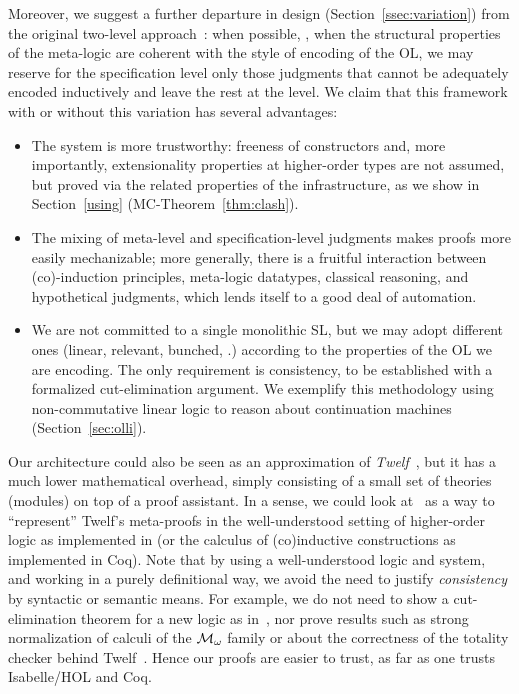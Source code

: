 \documentclass[final]{svjour3}
\begin{document}
Moreover, we suggest a further departure in design
(Section~\ref{ssec:variation}) from the original two-level
approach~\cite{McDowell01}: when possible, \ie, when the
structural properties of the meta-logic are coherent with the style of
encoding of the OL, we may reserve for the specification level only those
judgments that cannot be {adequately} encoded inductively and
leave the rest at the \HOL level.  We claim that this framework with
or without this variation has several advantages:

\begin{itemize}
\item The system is more trustworthy: freeness of constructors and,
  more importantly, extensionality properties at higher-order types are not
  assumed, but proved via the related properties of the
  infrastructure, as we show in Section~\ref{using} 
  (MC-Theorem~\ref{thm:clash}).
\item The mixing of meta-level and specification-level judgments makes proofs more
  easily mechanizable; more generally, there is a fruitful
  interaction between (co)-induction principles, meta-logic
  datatypes, classical reasoning, and hypothetical judgments, which
  lends itself to a good deal of automation.

\item We are not committed to a single monolithic SL,
  but we may adopt different ones (linear, relevant, bunched, \etc.)
  according to the properties of the OL we are encoding. The only
  requirement is consistency, to be established with a formalized
  cut-elimination argument.  We exemplify this methodology using
  non-commutative linear logic to reason about continuation machines
  (Section~\ref{sec:olli}).
\end{itemize}
 
Our architecture could also be seen as an approximation
of \emph{Twelf}~\cite{TwelfSP},
but it has a much lower mathematical overhead, simply consisting of a
small set of theories (modules) on top of a proof assistant. In a
sense, we could look at \hybrid\ as a way to ``represent'' Twelf's
meta-proofs in the well-understood setting of higher-order logic as
implemented in \HOL (or the calculus of (co)inductive constructions as
implemented in Coq). Note that by using a well-understood logic and
system, and working in a purely definitional way, we avoid the need to
justify \emph{consistency} by syntactic or semantic means.  For
example, we do not need to show a cut-elimination theorem for a new
logic as in~\cite{gacek08lics}, nor prove results such as strong
normalization of calculi of the $\cal M_{\omega}$ family \cite{S00} or
about the correctness of the totality checker behind
Twelf~\cite{SchurmannP03}. Hence our proofs are easier to trust, as
far as one trusts Isabelle/HOL and Coq.
\end{document}
